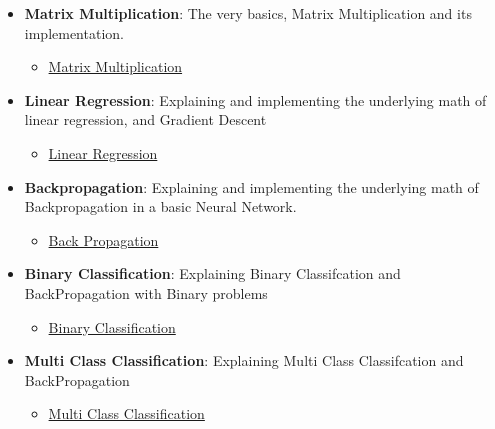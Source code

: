 \documentclass{article}
\begin{document}
\begin{itemize}
    \item \textbf{Matrix Multiplication}: The very basics, Matrix Multiplication and its implementation.
    \begin{itemize}
        \item \href{/notebooks/StartingFromTheBasicsMatrixMultiplication.ipynb}{Matrix Multiplication}
    \end{itemize}
        \item \textbf{Linear Regression}: Explaining and implementing the underlying math of linear regression, and Gradient Descent
    \begin{itemize}
        \item \href{/notebooks/StartingFromTheBasicsLinearRegression.ipynb}{Linear Regression}
    \end{itemize}
    \item \textbf{Backpropagation}: Explaining and implementing the underlying math of Backpropagation in a basic Neural Network.
    \begin{itemize}
        \item \href{/notebooks/StartingFromTheBasicsBackPropagation.ipynb}{Back Propagation}
    \end{itemize}
    \item \textbf{Binary Classification}: Explaining Binary Classifcation and BackPropagation with Binary problems
    \begin{itemize}
        \item \href{/notebooks/StartingFromTheBasicsBinaryClassification.ipynb}{Binary Classification}
    \end{itemize}
    \item \textbf{Multi Class Classification}: Explaining Multi Class Classifcation and BackPropagation
    \begin{itemize}
        \item \href{StartingFromTheBasicsMultiClassClassification.ipynb}{Multi Class Classification}
    \end{itemize}
\end{itemize}
\end{document}
